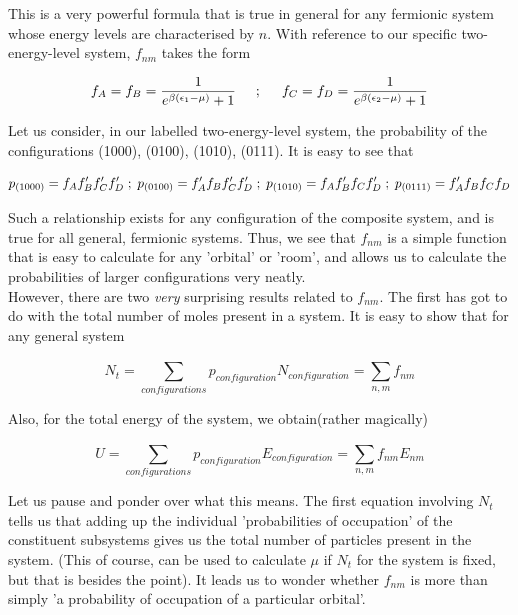 \documentclass[oneside]{book}
\begin{document}
\begin{center}
\end{center}

This is a very powerful formula that is true in general for any fermionic system whose energy levels are characterised by $n$. With reference to our specific two-energy-level system, $f_{nm}$ takes the form

\[ f_A = f_B = \frac{1}{e^{\beta(\epsilon_{1} - \mu)}+ 1}\hspace{0.5cm};\hspace{0.5cm} 
f_C = f_D = \frac{1}{e^{\beta(\epsilon_{2} - \mu)}+ 1}\]

Let us consider, in our labelled two-energy-level system, the probability of the configurations (1000), (0100), (1010), (0111). It is easy to see that

\[  p_{(1000)} = f_Af'_Bf'_Cf'_D \hspace{0.1cm} ; \hspace{0.1cm} p_{(0100)} = f'_Af_Bf'_Cf'_D  
 \hspace{0.1cm} ; \hspace{0.1cm} p_{(1010)} = f_Af'_Bf_Cf'_D  \hspace{0.1cm} ; \hspace{0.1cm} p_{(0111)} = f'_Af_Bf_Cf_D \]

Such a relationship exists for any configuration of the composite system, and is true for all general, fermionic systems. Thus, we see that $f_{nm}$ is a simple function that is easy to calculate for any 'orbital' or 'room', and allows us to calculate the probabilities of larger configurations very neatly. \\

However, there are two \emph{very} surprising results related to $f_{nm}$. The first has got to do with the total number of moles present in a system. It is easy to show that for any general system

\[ N_t = \sum_{configurations}^{}p_{configuration}N_{configuration} = \sum_{n,m}^{}f_{nm}\]

Also, for the total energy of the system, we obtain(rather magically)

\[  U = \sum_{configurations}^{}p_{configuration}E_{configuration} = \sum_{n,m}^{}f_{nm}E_{nm}\]

Let us pause and ponder over what this means. The first equation involving $N_t$ tells us that adding up the individual 'probabilities of occupation' of the constituent subsystems gives us the total number of particles present in the system. (This of course, can be used to calculate $\mu$ if $N_t$ for the system is fixed, but that is besides the point). It leads us to wonder whether $f_{nm}$ is more than simply 'a probability of occupation of a particular orbital'.\\
\end{document}
